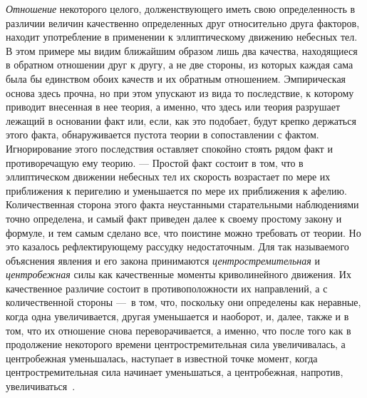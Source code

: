 {\em Отношение} некоторого целого, долженствующего иметь
свою определенность в различии величин качественно определенных друг
относительно друга факторов, находит употребление в применении к
эллиптическому движению небесных тел. В этом примере мы видим ближайшим
образом лишь два качества, находящиеся в обратном отношении друг к другу, а
не две стороны, из которых каждая сама была бы единством обоих качеств и их
обратным отношением. Эмпирическая основа здесь прочна, но при этом упускают
из вида то последствие, к которому приводит внесенная в нее теория, а
именно, что здесь или теория разрушает лежащий в основании факт или, если,
как это подобает, будут крепко держаться этого факта, обнаруживается
пустота теории в сопоставлении с фактом. Игнорирование этого последствия
оставляет спокойно стоять рядом факт и противоречащую ему теорию. — Простой
факт состоит в том, что в эллиптическом движении небесных тел их скорость
возрастает по мере их приближения к перигелию и уменьшается по мере их
приближения к афелию. Количественная сторона этого факта неустанными
старательными наблюдениями точно определена, и самый факт приведен далее к
своему простому закону и формуле, и тем самым сделано все, что поистине
можно требовать от теории. Но это казалось рефлектирующему рассудку
недостаточным. Для так называемого объяснения явления и его закона
принимаются {\em центростремительная} и
{\em центробежная} силы как качественные моменты
криволинейного движения. Их качественное различие состоит в
противоположности их направлений, а с количественной стороны —~в том, что,
поскольку они определены как неравные, когда одна увеличивается, другая
уменьшается и наоборот, и, далее, также и в том, что их отношение снова
переворачивается, а именно, что после того как в продолжение некоторого
времени центростремительная сила увеличивалась, а центробежная уменьшалась,
наступает в известной точке момент, когда центростремительная сила начинает
уменьшаться, а центробежная, напротив,
увеличиваться~.

